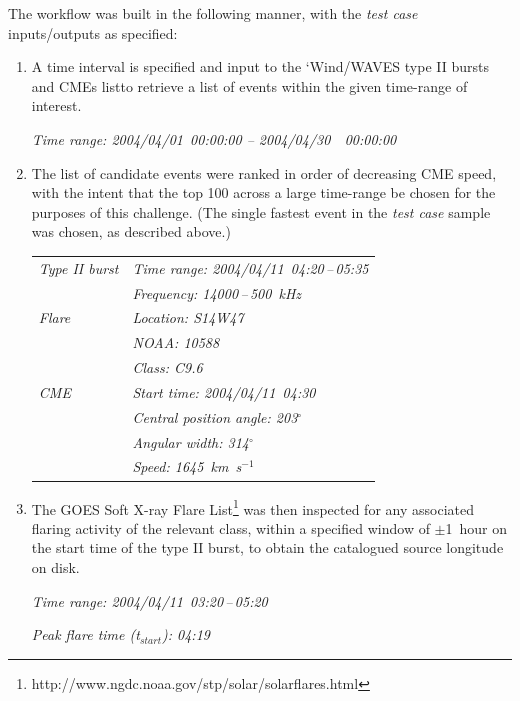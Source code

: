 \documentclass[namedreferences]{SolarPhysics}
\begin{document}
\begin{article}
The workflow was built in the following manner, with the \emph{test case} inputs/outputs as specified:


\begin{enumerate}
\setlength{\itemsep}{6pt}

\item A time interval is specified and input to the `Wind/WAVES type II bursts and CMEs list\footnotemark[\value{footnote}] to retrieve a list of events within the given time-range of interest.

\emph{Time range: 2004/04/01~00:00:00 -- 2004/04/30~~00:00:00}

\item The list of candidate events were ranked in order of decreasing CME speed, with the intent that the top 100 across a large time-range be chosen for the purposes of this challenge. (The single fastest event in the \emph{test case} sample was chosen, as described above.)

\begin{tabular}{l l}
\emph{Type II burst} & \emph{Time range: 2004/04/11~04:20\,--\,05:35} \\
& \emph{Frequency: 14000\,--\,500~kHz} \\
\emph{Flare} & \emph{Location: S14W47} \\
& \emph{NOAA: 10588} \\
& \emph{Class: C9.6} \\
\emph{CME} & \emph{Start time: 2004/04/11~04:30} \\
& \emph{Central position angle: 203$^{\circ}$} \\
& \emph{Angular width: 314$^{\circ}$} \\
& \emph{Speed: 1645~km~s$^{-1}$} \\
\end{tabular}


\item The GOES Soft X-ray Flare List\footnote{http://www.ngdc.noaa.gov/stp/solar/solarflares.html} was then inspected for any associated flaring activity of the relevant class, within a specified window of $\pm$1~hour on the start time of the type II burst, to obtain the catalogued source longitude on disk.

\emph{Time range: 2004/04/11~03:20\,--\,05:20}

\emph{Peak flare time (t$_{start}$): 04:19}


\end{enumerate}
\end{article}
\end{document}
